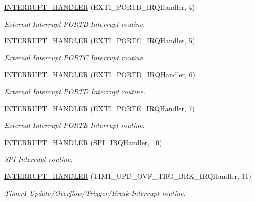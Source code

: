 \begin{DoxyCompactItemize}
\hyperlink{group___u_a_r_t1___printf_ga86ce0f83eea2ee331e775ceb7c30cc20}{I\+N\+T\+E\+R\+R\+U\+P\+T\+\_\+\+H\+A\+N\+D\+L\+ER} (E\+X\+T\+I\+\_\+\+P\+O\+R\+T\+B\+\_\+\+I\+R\+Q\+Handler, 4)
\begin{DoxyCompactList}\small\item\em External Interrupt P\+O\+R\+TB Interrupt routine. \end{DoxyCompactList}\item 
\hyperlink{group___u_a_r_t1___printf_gacc23dfa2a45b3af59288c92b043a7e78}{I\+N\+T\+E\+R\+R\+U\+P\+T\+\_\+\+H\+A\+N\+D\+L\+ER} (E\+X\+T\+I\+\_\+\+P\+O\+R\+T\+C\+\_\+\+I\+R\+Q\+Handler, 5)
\begin{DoxyCompactList}\small\item\em External Interrupt P\+O\+R\+TC Interrupt routine. \end{DoxyCompactList}\item 
\hyperlink{group___u_a_r_t1___printf_ga59390d34688c1b45935564d84ea80f51}{I\+N\+T\+E\+R\+R\+U\+P\+T\+\_\+\+H\+A\+N\+D\+L\+ER} (E\+X\+T\+I\+\_\+\+P\+O\+R\+T\+D\+\_\+\+I\+R\+Q\+Handler, 6)
\begin{DoxyCompactList}\small\item\em External Interrupt P\+O\+R\+TD Interrupt routine. \end{DoxyCompactList}\item 
\hyperlink{group___u_a_r_t1___printf_gae4176b1508bc94211161a893dae25b1b}{I\+N\+T\+E\+R\+R\+U\+P\+T\+\_\+\+H\+A\+N\+D\+L\+ER} (E\+X\+T\+I\+\_\+\+P\+O\+R\+T\+E\+\_\+\+I\+R\+Q\+Handler, 7)
\begin{DoxyCompactList}\small\item\em External Interrupt P\+O\+R\+TE Interrupt routine. \end{DoxyCompactList}\item 
\hyperlink{group___u_a_r_t1___printf_ga43f22297150084bb297aba9f0176aeac}{I\+N\+T\+E\+R\+R\+U\+P\+T\+\_\+\+H\+A\+N\+D\+L\+ER} (S\+P\+I\+\_\+\+I\+R\+Q\+Handler, 10)
\begin{DoxyCompactList}\small\item\em S\+PI Interrupt routine. \end{DoxyCompactList}\item 
\hyperlink{group___u_a_r_t1___printf_ga6ff0f2fb63043f22054a22f37bb4f36a}{I\+N\+T\+E\+R\+R\+U\+P\+T\+\_\+\+H\+A\+N\+D\+L\+ER} (T\+I\+M1\+\_\+\+U\+P\+D\+\_\+\+O\+V\+F\+\_\+\+T\+R\+G\+\_\+\+B\+R\+K\+\_\+\+I\+R\+Q\+Handler, 11)
\begin{DoxyCompactList}\small\item\em Timer1 Update/\+Overflow/\+Trigger/\+Break Interrupt routine. \end{DoxyCompactList}\item 

\end{DoxyCompactItemize}
